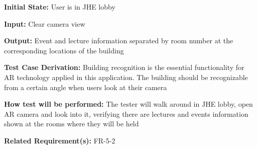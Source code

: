 \documentclass[12pt, titlepage]{article}
\begin{document}
\begin{enumerate}
\textbf{Initial State:} User is in JHE lobby

\textbf{Input:} Clear camera view
					
\textbf{Output:} Event and lecture information separated by room number at the corresponding locations of the building

\textbf{Test Case Derivation:} Building recognition is the essential functionality for AR technology applied in this application. The building should be recognizable from a certain angle when users look at their camera
					
\textbf{How test will be performed:} The tester will walk around in JHE lobby, open AR camera and look into it, verifying there are lectures and events information shown at the rooms where they will be held

\textbf{Related Requirement(s):} FR-5-2
\end{enumerate}
\end{document}
